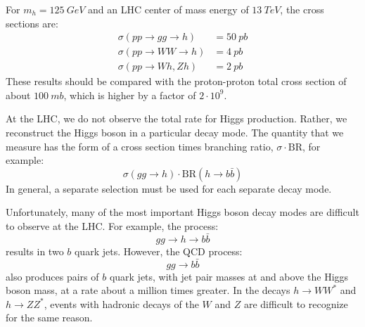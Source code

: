 \documentclass[../../main/main.tex]{subfiles}
\begin{document}
For \( m_h = 125 \ \si{GeV} \) and an LHC center of mass energy of \( 13 \ \si{TeV} \), the cross sections are:
\begin{align}
	\sigma(pp \rightarrow gg \rightarrow h) &= 50 \ \si{pb}	\\
	\sigma(pp \rightarrow WW \rightarrow h) &=  4 \ \si{pb}	\\
	\sigma(pp \rightarrow Wh, Zh)           &=  2 \ \si{pb}
\end{align}
These results should be compared with the proton-proton total cross section of about \( 100 \ \si{mb} \), which is higher by a factor of \( 2 \cdot 10^{9} \).

At the LHC, we do not observe the total rate for Higgs production. Rather, we reconstruct the Higgs boson in a particular decay mode. The quantity that we measure has the form of a cross section times branching
ratio, \( \sigma \cdot \text{BR} \), for example:
\begin{equation}
	\sigma(gg \rightarrow h) \cdot \text{BR}(h \rightarrow b\bar{b})
	\label{eq:}
\end{equation}
In general, a separate selection must be used for each separate decay mode.

Unfortunately, many of the most important Higgs boson decay modes are difficult to observe at the LHC. For example, the process:
\begin{equation}
	gg
	\rightarrow
	h
	\rightarrow
	b\bar{b}
	\label{eq:}
\end{equation}
results in two \( b \) quark jets. However, the QCD process:
\begin{equation}
	gg
	\rightarrow
	b\bar{b}
	\label{eq:}
\end{equation}
also produces pairs of \( b \) quark jets, with jet pair masses at and above the Higgs boson mass, at a rate about a million times greater. In the decays \( h \rightarrow WW^* \) and \( h \rightarrow ZZ^* \), events with hadronic decays of the \( W \) and \( Z \) are difficult to recognize for the same reason.
\end{document}
